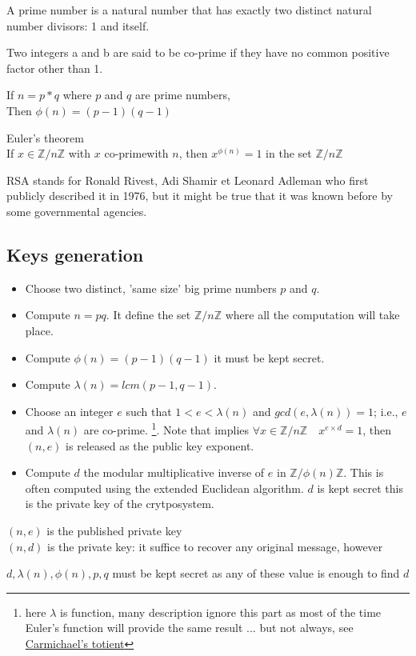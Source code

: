 \begin{mydef}
	A prime number is a natural number that has exactly two distinct natural number divisors: 1 and itself.
\end{mydef}
\begin{mydef}
	Two integers a and b are said to be co-prime if they have no common positive factor other than 1.
\end{mydef}
\begin{mythm}
	If $ n = p*q $ where $p$ and $q$ are prime numbers,\\
	Then $\phi(n) = (p-1)(q-1)$
\end{mythm}
\begin{mythm}{Euler's theorem}\\
	\label{Euler's theorem}
	If $x \in \mathbb{Z}/{n \mathbb{Z}}$ with $x$ co-primewith $n$,
	then $x^{\phi(n)}=1$ in the set $\mathbb{Z}/{n \mathbb{Z}}$
\end{mythm}


RSA stands for Ronald Rivest, Adi Shamir et Leonard Adleman who first publicly described it in 1976, but it might be true that it was known before by some governmental agencies.
\subsection*{Keys generation}
\begin{itemize}
\item Choose two distinct, 'same size' big prime numbers $p$ and $q$.
\item Compute $n = pq$. It define the set $\mathbb{Z}/{n \mathbb{Z}}$ where all the computation will take place.
\item Compute $ \phi(n)= (p-1)(q-1)$ it must be kept secret. 
\item Compute $\lambda(n) = lcm(p-1, q-1)$. 
\item Choose an integer $e$ such that $1 < e < \lambda(n)$ and $gcd(e, \lambda(n)) = 1$; i.e., $e$ and $\lambda(n)$ are co-prime.
	\footnote{here $\lambda$ is  function, many description ignore this part as most of the time Euler's function will provide the same result ... but not always, see
		\href{https://en.wikipedia.org/wiki/Carmichael_function}{Carmichael's totient}}. Note that implies $\forall x \in \mathbb{Z}/{n \mathbb{Z}} \quad x^{e \times d} =1 $, then $(n, e)$ is released as the public key exponent.
\item Compute $d$ the modular multiplicative inverse of $e$ in $\mathbb{Z}/{\phi(n) \mathbb{Z}}$.
This is often computed using the extended Euclidean algorithm.
$d$ is kept secret this is the private key of the crytposystem.
\end{itemize}
$(n,e)$ is the published private key\\
$(n,d)$ is the private key: it suffice to recover any original message, however
\begin{center}
	$d,\lambda(n),\phi(n),p,q$ must be kept secret as any of these value is enough to find $d$	
\end{center}


